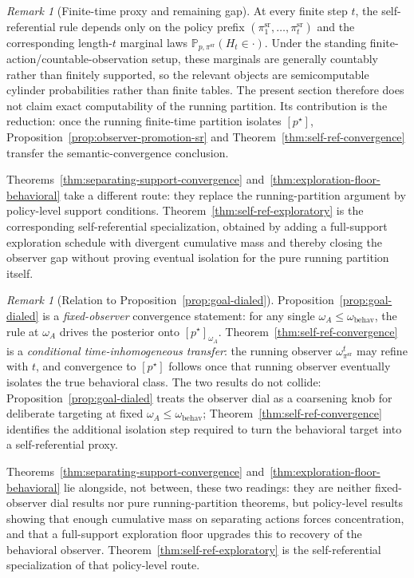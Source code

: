 \documentclass[11pt]{article}
\theoremstyle{definition}
\theoremstyle{remark}
\newtheorem{remark}[theorem]{Remark}
\newcommand{\Prob}{\mathbb{P}}
\begin{document}
\begin{remark}[Finite-time proxy and remaining gap]
\label{rem:self-ref-computability}
At every finite step $t$, the self-referential rule depends only on the policy prefix $(\pi^{\mathrm{sr}}_1,\dots,\pi^{\mathrm{sr}}_t)$ and the corresponding length-$t$ marginal laws $\Prob_{p,\pi^{\mathrm{sr}}}(H_t\in\cdot)$. Under the standing finite-action/countable-observation setup, these marginals are generally countably rather than finitely supported, so the relevant objects are semicomputable cylinder probabilities rather than finite tables. The present section therefore does not claim exact computability of the running partition. Its contribution is the reduction: once the running finite-time partition isolates $[p^\star]$, Proposition~\ref{prop:observer-promotion-sr} and Theorem~\ref{thm:self-ref-convergence} transfer the semantic-convergence conclusion.
\par
Theorems~\ref{thm:separating-support-convergence} and~\ref{thm:exploration-floor-behavioral} take a different route: they replace the running-partition argument by policy-level support conditions. Theorem~\ref{thm:self-ref-exploratory} is the corresponding self-referential specialization, obtained by adding a full-support exploration schedule with divergent cumulative mass and thereby closing the observer gap without proving eventual isolation for the pure running partition itself.
\end{remark}

\begin{remark}[Relation to Proposition~\ref{prop:goal-dialed}]
\label{rem:self-ref-vs-goal-dialed}
Proposition~\ref{prop:goal-dialed} is a \emph{fixed-observer} convergence statement: for any single $\omega_A\le\omega_{\mathrm{behav}}$, the rule at $\omega_A$ drives the posterior onto $[p^\star]_{\omega_A}$. Theorem~\ref{thm:self-ref-convergence} is a \emph{conditional time-inhomogeneous transfer}: the running observer $\omega_{\pi^{\mathrm{sr}}}^t$ may refine with $t$, and convergence to $[p^\star]$ follows once that running observer eventually isolates the true behavioral class. The two results do not collide: Proposition~\ref{prop:goal-dialed} treats the observer dial as a coarsening knob for deliberate targeting at fixed $\omega_A\le\omega_{\mathrm{behav}}$; Theorem~\ref{thm:self-ref-convergence} identifies the additional isolation step required to turn the behavioral target into a self-referential proxy.
\par
Theorems~\ref{thm:separating-support-convergence} and~\ref{thm:exploration-floor-behavioral} lie alongside, not between, these two readings: they are neither fixed-observer dial results nor pure running-partition theorems, but policy-level results showing that enough cumulative mass on separating actions forces concentration, and that a full-support exploration floor upgrades this to recovery of the behavioral observer. Theorem~\ref{thm:self-ref-exploratory} is the self-referential specialization of that policy-level route.
\end{remark}
\end{document}
